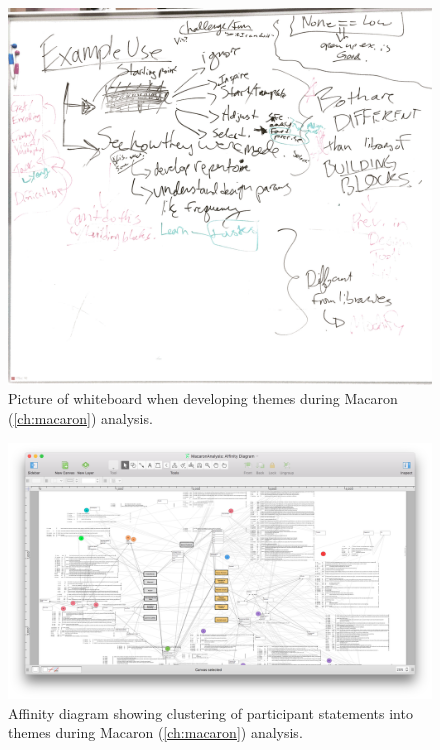 	\begin{figure}[htbp] %
	   \centering
	   \includegraphics[height=\textwidth,angle=90]{Chapter99-SupportingMaterials/MethodExamples/MacaronAnalysisWhiteboard} 
	   \caption{Picture of whiteboard when developing themes during Macaron (\autoref{ch:macaron}) analysis.}
	   \label{fig:SupportingMaterials:MethodExamples:MacaronAnalysisWhiteboard}
	\end{figure}
	
	
	\begin{figure}[htbp] %
	   \centering
	   \includegraphics[width=0.9\textheight,angle=90]{Chapter99-SupportingMaterials/MethodExamples/MacaronClustering} 
	   \caption{Affinity diagram showing clustering of participant statements into themes during Macaron (\autoref{ch:macaron}) analysis.}
	   \label{fig:SupportingMaterials:MethodExamples:MacaronClustering}
	\end{figure}

